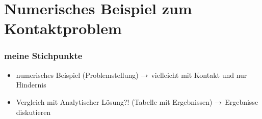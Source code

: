 \section{Numerisches Beispiel zum Kontaktproblem}
\label{kap:6.2}



\subsubsection{meine Stichpunkte}

\begin{itemize}
\item numerisches Beispiel (Problemstellung) $\rightarrow$ vielleicht mit Kontakt und nur Hindernis
\item Vergleich mit Analytischer Lösung?! (Tabelle mit Ergebnissen) $\rightarrow$ Ergebnisse diskutieren
\end{itemize}


\newpage

